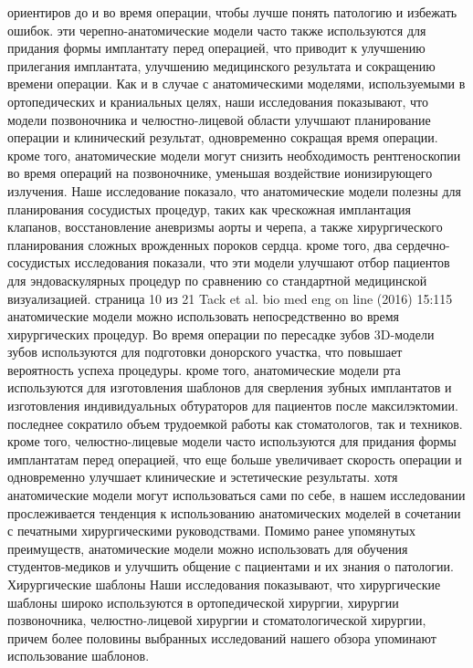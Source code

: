 ориентиров до и во время операции, чтобы лучше понять патологию и избежать
ошибок. эти черепно-анатомические модели часто также используются для придания
формы имплантату перед операцией, что приводит к улучшению прилегания
имплантата, улучшению медицинского результата и сокращению времени операции. Как
и в случае с анатомическими моделями, используемыми в ортопедических и
краниальных целях, наши исследования показывают, что модели позвоночника и
челюстно-лицевой области улучшают планирование операции и клинический результат,
одновременно сокращая время операции. кроме того, анатомические модели могут
снизить необходимость рентгеноскопии во время операций на позвоночнике, уменьшая
воздействие ионизирующего излучения. Наше исследование показало, что
анатомические модели полезны для планирования сосудистых процедур, таких как
чрескожная имплантация клапанов, восстановление аневризмы аорты и черепа, а
также хирургического планирования сложных врожденных пороков сердца. кроме того,
два сердечно-сосудистых исследования показали, что эти модели улучшают отбор
пациентов для эндоваскулярных процедур по сравнению со стандартной медицинской
визуализацией. страница 10 из 21 Tack et al. bio med eng on line (2016) 15:115
анатомические модели можно использовать непосредственно во время хирургических
процедур. Во время операции по пересадке зубов 3D-модели зубов используются для
подготовки донорского участка, что повышает вероятность успеха процедуры. кроме
того, анатомические модели рта используются для изготовления шаблонов для
сверления зубных имплантатов и изготовления индивидуальных обтураторов для
пациентов после максилэктомии. последнее сократило объем трудоемкой работы как
стоматологов, так и техников. кроме того, челюстно-лицевые модели часто
используются для придания формы имплантатам перед операцией, что еще больше
увеличивает скорость операции и одновременно улучшает клинические и эстетические
результаты. хотя анатомические модели могут использоваться сами по себе, в нашем
исследовании прослеживается тенденция к использованию анатомических моделей в
сочетании с печатными хирургическими руководствами. Помимо ранее упомянутых
преимуществ, анатомические модели можно использовать для обучения
студентов-медиков и улучшить общение с пациентами и их знания о патологии.
Хирургические шаблоны Наши исследования показывают, что хирургические шаблоны
широко используются в ортопедической хирургии, хирургии позвоночника,
челюстно-лицевой хирургии и стоматологической хирургии, причем более половины
выбранных исследований нашего обзора упоминают использование шаблонов.

